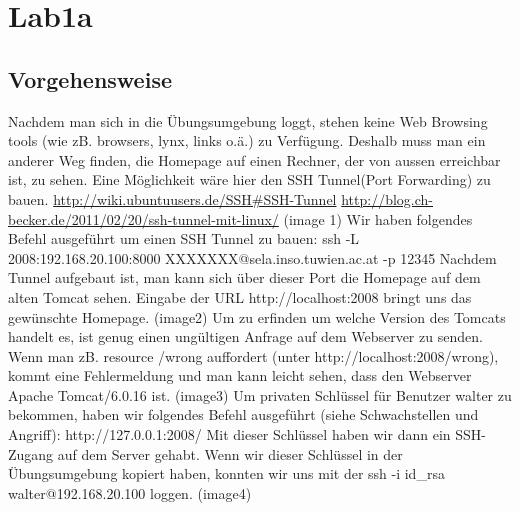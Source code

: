 \documentclass[12pt,a4paper,titlepage,oneside]{scrartcl}
\begin{document}
\maketitle
\setcounter{section}{0}
\setcounter{tocdepth}{2}
\tableofcontents

%
%

\section{Lab1a}

\subsection{Vorgehensweise}
Nachdem man sich in die Übungsumgebung loggt, stehen keine Web Browsing tools (wie zB. browsers, lynx, links o.ä.) zu Verfügung. Deshalb muss man ein anderer Weg finden, die Homepage auf einen Rechner, der von aussen erreichbar ist, zu sehen. Eine Möglichkeit wäre hier den SSH Tunnel(Port Forwarding) zu bauen.
\url{http://wiki.ubuntuusers.de/SSH#SSH-Tunnel}
\url{http://blog.ch-becker.de/2011/02/20/ssh-tunnel-mit-linux/}
(image 1)
Wir haben folgendes Befehl ausgeführt um einen SSH Tunnel zu bauen:
ssh -L 2008:192.168.20.100:8000 XXXXXXX@sela.inso.tuwien.ac.at -p 12345
Nachdem Tunnel aufgebaut ist, man kann sich über dieser Port die Homepage auf dem alten Tomcat sehen. Eingabe der URL http://localhost:2008 bringt uns das gewünschte Homepage.
(image2)
Um zu erfinden um welche Version des Tomcats handelt es, ist genug einen ungültigen Anfrage auf dem Webserver zu senden. Wenn man zB. resource /wrong auffordert (unter http://localhost:2008/wrong), kommt eine Fehlermeldung und man kann leicht sehen,  dass den Webserver Apache Tomcat/6.0.16 ist.
(image3)
Um privaten Schlüssel für Benutzer walter zu bekommen, haben wir folgendes Befehl ausgeführt (siehe Schwachstellen und Angriff): http://127.0.0.1:2008/%
Mit dieser Schlüssel haben wir dann ein SSH-Zugang auf dem Server gehabt. Wenn wir dieser Schlüssel in der Übungsumgebung kopiert haben, konnten wir uns mit der 
ssh -i id_rsa walter@192.168.20.100 loggen.
(image4)
\end{document}
